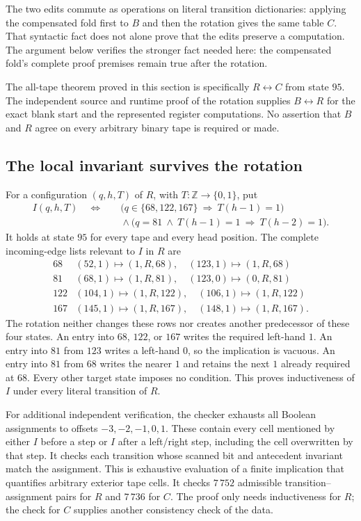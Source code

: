 The two edits commute as operations on literal transition dictionaries:
applying the compensated fold first to $B$ and then the rotation gives
the same table $C$.  That syntactic fact does not alone prove that the
edits preserve a computation.  The argument below verifies the stronger
fact needed here: the compensated fold's complete proof premises remain
true after the rotation.

The all-tape theorem proved in this section is specifically
$R\leftrightarrow C$ from state $95$.  The independent source and runtime
proof of the rotation supplies $B\leftrightarrow R$ for the exact blank
start and the represented register computations.  No assertion that
$B$ and $R$ agree on every arbitrary binary tape is required or made.

\subsection{The local invariant survives the rotation}

For a configuration $(q,h,T)$ of $R$, with
$T:\mathbb Z\to\{0,1\}$, put
\[
\begin{split}
I(q,h,T)\quad\Longleftrightarrow\quad&
 \bigl(q\in\{68,122,167\}\ \Longrightarrow\ T(h-1)=1\bigr)\\
&{}\land
 \bigl(q=81\ \land\ T(h-1)=1\ \Longrightarrow\ T(h-2)=1\bigr).
\end{split}
\]
It holds at state $95$ for every tape and every head position.
The complete incoming-edge lists relevant to $I$ in $R$ are
\[
\begin{array}{c|l}
68&(52,1)\mapsto(1,R,68),\quad(123,1)\mapsto(1,R,68)\\
81&(68,1)\mapsto(1,R,81),\quad(123,0)\mapsto(0,R,81)\\
122&(104,1)\mapsto(1,R,122),\quad(106,1)\mapsto(1,R,122)\\
167&(145,1)\mapsto(1,R,167),\quad(148,1)\mapsto(1,R,167).
\end{array}
\]
The rotation neither changes these rows nor creates another predecessor
of these four states.  An entry into $68$, $122$, or $167$ writes the
required left-hand $1$.  An entry into $81$ from $123$ writes a left-hand
$0$, so the implication is vacuous.  An entry into $81$ from $68$ writes
the nearer $1$ and retains the next $1$ already required at $68$.
Every other target state imposes no condition.  This proves inductiveness
of $I$ under every literal transition of $R$.

For additional independent verification, the checker exhausts all Boolean
assignments to offsets $-3,-2,-1,0,1$.  These contain every cell mentioned
by either $I$ before a step or $I$ after a left/right step, including the
cell overwritten by that step.  It checks each transition whose scanned
bit and antecedent invariant match the assignment.  This is exhaustive
evaluation of a finite implication that quantifies arbitrary exterior
tape cells.  It checks $7\,752$ admissible transition--assignment pairs
for $R$ and $7\,736$ for $C$.  The proof only needs inductiveness for
$R$; the check for $C$ supplies another consistency check of the data.

